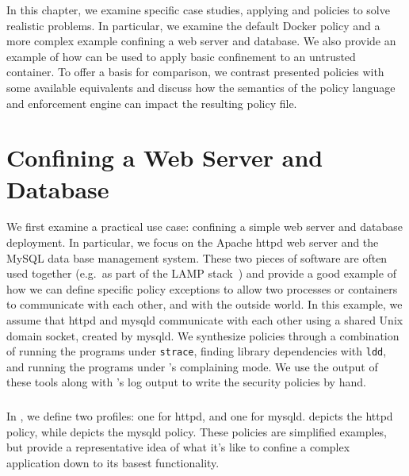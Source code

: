 In this chapter, we examine specific case studies, applying \bpfbox{} and \bpfcontain{}
policies to solve realistic problems. In particular, we examine the default Docker policy
and a more complex example confining a web server and database. We also provide an example
of how \bpfcontain{} can be used to apply basic confinement to an untrusted container. To
offer a basis for comparison, we contrast presented policies with some available
equivalents and discuss how the semantics of the policy language and enforcement engine
can impact the resulting policy file.


%
\section{Confining a Web Server and Database}

We first examine a practical use case: confining a simple web server and database
deployment. In particular, we focus on the Apache httpd web server and the MySQL data base
management system. These two pieces of software are often used together (e.g.\ as part of
the LAMP stack~\cite{lamp}) and provide a good example of how we can define specific
policy exceptions to allow two processes or containers to communicate with each other, and
with the outside world. In this example, we assume that httpd and mysqld communicate with
each other using a shared Unix domain socket, created by mysqld. We synthesize policies
through a combination of running the programs under \texttt{strace}, finding library
dependencies with \texttt{ldd}, and running the programs under \bpfcontain{}'s complaining
mode. We use the output of these tools along with \bpfcontain{}'s log output to write
the security policies by hand.

\subsubsection{\bpfbox{}}

In \bpfbox{}, we define two profiles: one for httpd, and one for mysqld.
 depicts the httpd policy, while  depicts
the mysqld policy. These policies are simplified examples, but provide a representative
idea of what it's like to confine a complex application down to its basest functionality.

